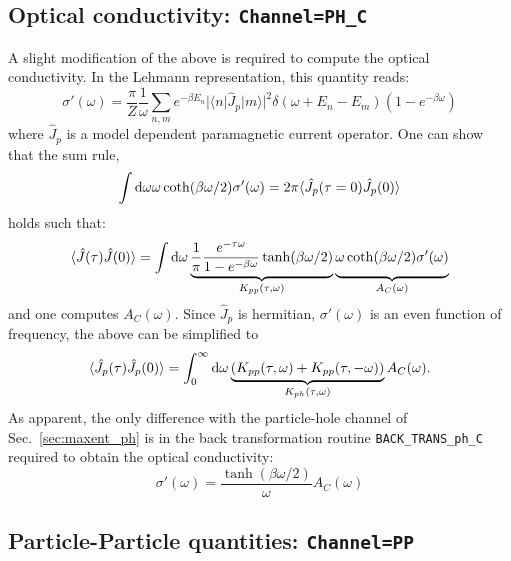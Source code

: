 \subsection{Optical conductivity: \texttt{Channel=PH\_C}}

A  slight modification of the above is required to compute  the optical conductivity. In the Lehmann representation, this quantity reads:
\begin{equation}
  \sigma'(\omega) =  \frac{\pi}{Z} \frac{1}{\omega} \sum_{n,m} e^{-\beta E_n} |\langle n | \hat{J}_p | m \rangle |^2 
  \delta ( \omega + E_n - E_m) \left( 1 - e^{-\beta  \omega} \right) 
\end{equation}
where  $\hat{J}_p$ is a model dependent paramagnetic current operator.  One can show that the sum rule, 
\begin{equation}
	\int \mathrm{d} \omega 	 \omega \coth(\beta \omega/2) \sigma'(\omega) = 
  2 \pi \langle \hat{J}_p(\tau=0) \hat{J}_p(0) \rangle
\end{equation}
holds  such  that: 
\begin{equation}
  \label{eqn:A_ph_C_def}
	\langle \hat{J}(\tau) \hat{J}(0) \rangle  =  
       \int \d \omega  \underbrace{ \frac{1}{\pi} \frac{e^{- \tau \omega} }
            { 1 - e^{-\beta  \omega} } \tanh(\beta \omega/2)  }_{K_{pp}(\tau,\omega)} 
       \underbrace{ \omega \coth(\beta \omega/2) \sigma'(\omega) \vphantom{\frac{1}{2-1}} }_{A_C(\omega)} 
\end{equation}
and one computes $A_C(\omega)$. Since  $\hat{J}_p $  is hermitian, $\sigma'(\omega)$ is an even function of frequency, the above can be simplified to 
\begin{equation} 
    \langle \hat{J}_p(\tau) \hat{J}_p(0) \rangle  =  
         \int_{0}^{\infty}  \mathrm{d} \omega \underbrace{\left( K_{pp}(\tau,\omega)  + K_{pp}(\tau,-\omega) \right)}_{K_{ph}(\tau,\omega)}  A_C(\omega).
\end{equation}
As apparent,  the only difference with the particle-hole channel of Sec.~\ref{sec:maxent_ph} is in the 
back transformation routine \texttt{BACK\_TRANS\_ph\_C}  required to obtain the optical conductivity: 
\begin{equation}
	\sigma'(\omega) =  \frac{\tanh\left( \beta \omega/2\right)}{\omega}A_C(\omega)
\end{equation} 

\subsection{Particle-Particle quantities: \texttt{Channel=PP}}

